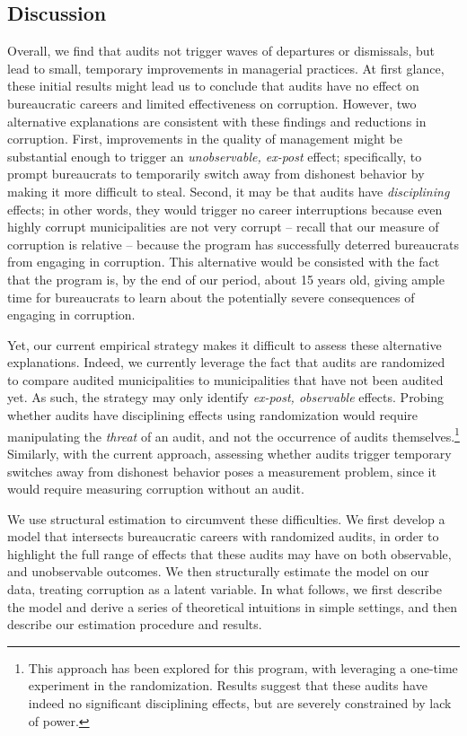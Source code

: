 \subsection{Discussion}

Overall, we find that audits not trigger waves of departures or dismissals, but lead to small, temporary improvements in managerial practices. At first glance, these initial results might lead us to conclude that audits have no effect on bureaucratic careers and limited effectiveness on corruption. However, two alternative explanations are consistent with these findings and reductions in corruption. First, improvements in the quality of management might be substantial enough to trigger an \emph{unobservable, ex-post} effect; specifically, to prompt bureaucrats to temporarily switch away from dishonest behavior by making it more difficult to steal. Second, it may be that audits have \emph{disciplining} effects; in other words, they would trigger no career interruptions because even highly corrupt municipalities are not very corrupt -- recall that our measure of corruption is relative -- because the program has successfully deterred bureaucrats from engaging in corruption. This alternative would be consisted with the fact that the program is, by the end of our period, about 15 years old, giving ample time for bureaucrats to learn about the potentially severe consequences of engaging in corruption. 

Yet, our current empirical strategy makes it difficult to assess these alternative explanations. Indeed, we currently leverage the fact that audits are randomized to compare audited municipalities to municipalities that have not been audited yet. As such, the strategy may only identify \emph{ex-post, observable} effects. Probing whether audits have disciplining effects using randomization would require manipulating the \emph{threat} of an audit, and not the occurrence of audits themselves.\footnote{This approach has been explored for this program, with \citet{poulsen2019corruption} leveraging a one-time experiment in the randomization. Results suggest that these audits have indeed no significant disciplining effects, but are severely constrained by lack of power.} Similarly, with the current approach, assessing whether audits trigger temporary switches away from dishonest behavior poses a measurement problem, since it would require measuring corruption without an audit. 

We use structural estimation to circumvent these difficulties. We first develop a model that intersects bureaucratic careers with randomized audits, in order to highlight the full range of effects that these audits may have on both observable, and unobservable outcomes. We then structurally estimate the model on our data, treating corruption as a latent variable. In what follows, we first describe the model and derive a series of theoretical intuitions in simple settings, and then describe our estimation procedure and results.


